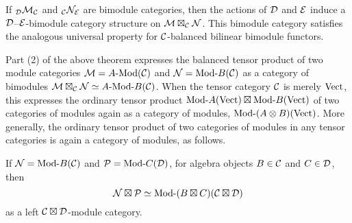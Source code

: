 \documentclass{amsart}
\begin{document}
\begin{remark}
	If ${}_{\mathcal D}\mathcal M_{\mathcal C}$ and ${}_{\mathcal C}\mathcal N_{\mathcal E}$ are bimodule categories, then the actions of $\mathcal D$ and $\mathcal E$ induce a $\mathcal D$--$\mathcal E$-bimodule category structure on $\mathcal M \boxtimes_{\mathcal C} \mathcal N$. This bimodule category satisfies the analogous universal property for $\mathcal C$-balanced bilinear bimodule functors.
\end{remark}


Part (2) of the above theorem expresses the balanced tensor product of two module categories $\cM = \Mod{A}{}(\cC)$ and $\cN = \Mod{}{B}(\cC)$ as a category of bimodules $\cM \boxtimes_\cC \cN \simeq \Mod{A}{B}(\cC)$.  When the tensor category $\mathcal C$ is merely $\mathrm{Vect}$, this expresses the ordinary tensor product $\Mod{}{A}(\Vect) \boxtimes \Mod{}{B}(\Vect)$ of two categories of modules again as a category of modules, $\Mod{}{(A \otimes B)}(\Vect)$.  More generally, the ordinary tensor product of two categories of modules in any tensor categories is again a category of modules, as follows.

\begin{proposition}
	If $\cN = \Mod{}{B}(\cC)$ and $\cP = \Mod{}{C}(\cD)$, for algebra objects $B \in \mathcal C$ and $C \in \mathcal D$, then $$\cN \boxtimes \cP \simeq \Mod{}{(B \boxtimes C)}(\cC \boxtimes \cD)$$ as a left $\mathcal C \boxtimes \mathcal D$-module category.
\end{proposition}
\end{document}
